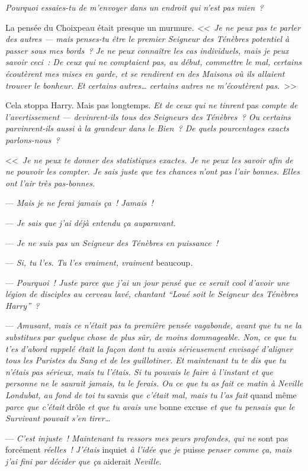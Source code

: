 \emph{Pourquoi essaies-tu de m'envoyer dans un endroit qui n'est pas mien~?}

La pensée du Choixpeau était presque un murmure. \emph{<<~Je ne peux pas te parler des autres — mais penses-tu être le premier Seigneur des Ténèbres potentiel à passer sous mes bords~? Je ne peux connaître les cas individuels, mais je peux savoir ceci~: De ceux qui ne comptaient pas, au début, commettre le mal, certains écoutèrent mes mises en garde, et se rendirent en des Maisons où ils allaient trouver le bonheur. Et certains autres… certains autres ne m'écoutèrent pas.}~>>

Cela stoppa Harry. Mais pas longtemps. \emph{Et de ceux qui ne tinrent} pas \emph{compte de l'avertissement — devinrent-ils tous des Seigneurs des Ténèbres~? Ou certains parvinrent-ils aussi à la grandeur dans le Bien~? De quels pourcentages exacts parlons-nous~?}

<<~\emph{Je ne peux te donner des statistiques exactes. Je ne peux les savoir afin de ne pouvoir les compter. Je sais juste que tes chances n'ont pas l'air bonnes. Elles ont l'air très pas-bonnes.}

--- \emph{Mais je ne ferai jamais ça~! Jamais~!}

--- \emph{Je sais que j'ai déjà entendu ça auparavant.}

--- \emph{Je ne suis pas un Seigneur des Ténèbres en puissance~!}

--- \emph{Si, tu l'es. Tu l'es vraiment, vraiment} beaucoup\emph{.}

--- \emph{Pourquoi~! Juste parce que j'ai un jour pensé que ce serait cool d'avoir une légion de disciples au cerveau lavé, chantant “Loué soit le Seigneur des Ténèbres Harry”~?}

--- \emph{Amusant, mais ce n'était pas ta première pensée vagabonde, avant que tu ne la substitues par quelque chose de plus sûr, de moins dommageable. Non, ce que tu t'es d'abord rappelé était la façon dont tu avais sérieusement envisagé d'aligner tous les Puristes du Sang et de les guillotiner. Et maintenant tu te dis que tu n'étais pas sérieux, mais tu l'étais. Si tu pouvais le faire à l'instant et que personne ne le saurait jamais, tu le ferais. Ou ce que tu as fait ce matin à Neville Londubat, au fond de toi tu} savais \emph{que c'était mal, mais tu l'as fait} quand même \emph{parce que c'était} drôle \emph{et que tu avais une} bonne excuse \emph{et que tu pensais que le Survivant pouvait s'en tirer…}

--- \emph{C'est injuste~! Maintenant tu ressors mes peurs profondes, qui ne} sont pas forcément \emph{réelles~! J'étais} inquiet \emph{à l'idée que je} puisse \emph{penser comme ça, mais j'ai fini par décider que ça} aiderait \emph{Neville.}

